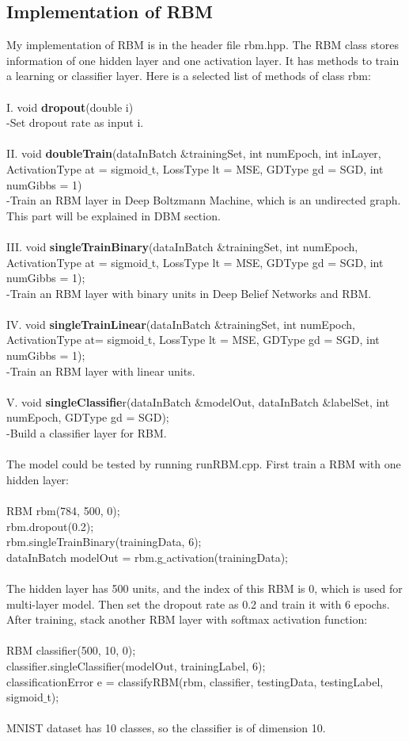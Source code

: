 \documentclass[12pt]{article}
\begin{document}
\subsection{Implementation of RBM}
My implementation of RBM is in the header file rbm.hpp. The RBM class stores information of one hidden layer and one activation layer. It has methods to train a learning or classifier layer. Here is a selected list of methods of class rbm:\\
\\
I. void \textbf{dropout}(double i)\\
-Set dropout rate as input i.\\
\\
II. void \textbf{doubleTrain}(dataInBatch $\&$trainingSet, int numEpoch, int inLayer, ActivationType at = sigmoid$\_$t, LossType lt = MSE, GDType gd = SGD, int numGibbs = 1)\\
-Train an RBM layer in Deep Boltzmann Machine, which is an undirected graph. This part will be explained in DBM section.\\
\\
III. void \textbf{singleTrainBinary}(dataInBatch $\&$trainingSet, int numEpoch, ActivationType at = sigmoid$\_$t, LossType lt = MSE, GDType gd = SGD, int numGibbs = 1);\\
-Train an RBM layer with binary units in Deep Belief Networks and RBM.\\
\\
IV. void \textbf{singleTrainLinear}(dataInBatch $\&$trainingSet, int numEpoch, ActivationType at= sigmoid$\_$t, LossType lt = MSE, GDType gd = SGD, int numGibbs = 1);\\
-Train an RBM layer with linear units.\\
\\
V. void \textbf{singleClassifie}r(dataInBatch $\&$modelOut, dataInBatch $\&$labelSet, int numEpoch, GDType gd = SGD);\\
-Build a classifier layer for RBM.\\
\\
The model could be tested by running runRBM.cpp. First train a RBM with one hidden layer:\\
\\
RBM rbm(784, 500, 0);\\
rbm.dropout(0.2);\\
rbm.singleTrainBinary(trainingData, 6);\\
dataInBatch modelOut = rbm.g$\_$activation(trainingData);\\
\\
The hidden layer has 500 units, and the index of this RBM is 0, which is used for multi-layer model. Then set the dropout rate as 0.2 and train it with 6 epochs. After training, stack another RBM layer with softmax activation function:\\
\\
RBM classifier(500, 10, 0);\\
classifier.singleClassifier(modelOut, trainingLabel, 6);\\
classificationError e = classifyRBM(rbm, classifier, testingData, testingLabel, sigmoid$\_$t);\\
\\
MNIST dataset has 10 classes, so the classifier is of dimension 10.
\end{document}
